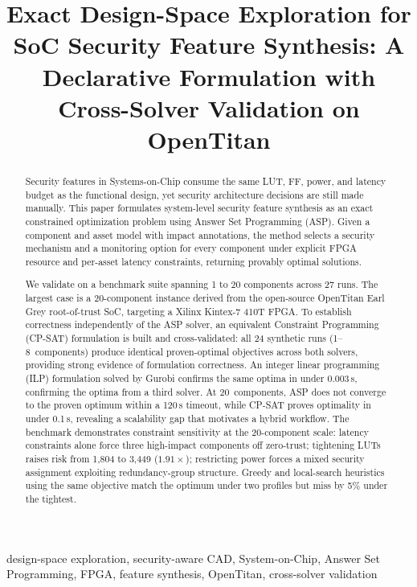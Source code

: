 \documentclass[conference]{IEEEtran}
\begin{document}
\title{Exact Design-Space Exploration for SoC Security Feature Synthesis: A Declarative Formulation with Cross-Solver Validation on OpenTitan}

\author{}

\maketitle

\begin{abstract}
Security features in Systems-on-Chip consume the same LUT, FF, power,
and latency budget as the functional design, yet security architecture
decisions are still made manually. This paper formulates system-level
security feature synthesis as an exact constrained optimization
problem using Answer Set Programming (ASP). Given a component and asset
model with impact annotations, the method selects a security mechanism
and a monitoring option for every component under explicit FPGA resource
and per-asset latency constraints, returning provably optimal solutions.

We validate on a benchmark suite spanning 1 to 20
components across 27 runs. The largest case is a 20-component
instance derived from the open-source OpenTitan Earl Grey
root-of-trust SoC, targeting a Xilinx Kintex-7 410T FPGA. To
establish correctness independently of the ASP solver, an equivalent
Constraint Programming (CP-SAT) formulation is built and
cross-validated: all 24 synthetic runs (1--8~components) produce
identical proven-optimal objectives across both solvers, providing
strong evidence of formulation correctness. An integer linear programming
(ILP) formulation solved by Gurobi confirms the same optima in under
0.003\,s, confirming the optima from a third solver.
At 20~components, ASP does not converge to
the proven optimum within a 120\,s timeout, while CP-SAT proves optimality in
under 0.1\,s, revealing a scalability gap that motivates a hybrid workflow. The benchmark demonstrates constraint sensitivity at
the 20-component scale: latency constraints alone force three high-impact
components off zero-trust; tightening LUTs raises risk from 1{,}804
to 3{,}449 ($1.91\times$); restricting power forces a mixed
security assignment exploiting redundancy-group structure.
Greedy and local-search heuristics using the same objective match the
optimum under two profiles but miss by 5\% under the tightest.
\end{abstract}

\begin{IEEEkeywords}
design-space exploration, security-aware CAD, System-on-Chip, Answer Set
Programming, FPGA, feature synthesis, OpenTitan, cross-solver validation
\end{IEEEkeywords}
\end{document}

